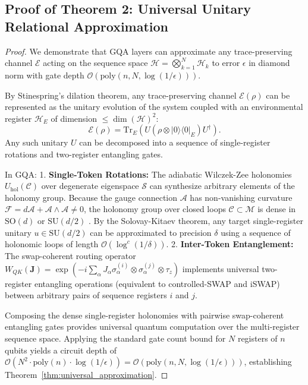 \documentclass{article}
\begin{document}
\subsection{Proof of Theorem 2: Universal Unitary Relational Approximation}
\label{sec:proof_thm2}

\begin{proof}
We demonstrate that GQA layers can approximate any trace-preserving channel $\mathcal{E}$ acting on the sequence space $\mathcal{H} = \bigotimes_{k=1}^N \mathcal{H}_k$ to error $\epsilon$ in diamond norm with gate depth $\mathcal{O}(\mathrm{poly}(n, N, \log(1/\epsilon)))$.

By Stinespring's dilation theorem, any trace-preserving channel $\mathcal{E}(\rho)$ can be represented as the unitary evolution of the system coupled with an environmental register $\mathcal{H}_E$ of dimension $\le \dim(\mathcal{H})^2$:
\begin{equation}
\mathcal{E}(\rho) = \mathrm{Tr}_E\left( U (\rho \otimes |0\rangle\langle 0|_E) U^\dagger \right).
\label{eq:stinespring}
\end{equation}
Any such unitary $U$ can be decomposed into a sequence of single-register rotations and two-register entangling gates. 

In GQA:
1. \textbf{Single-Token Rotations:} The adiabatic Wilczek-Zee holonomies $U_{\mathrm{hol}}(\mathcal{C})$ over degenerate eigenspace $\mathcal{S}$ can synthesize arbitrary elements of the holonomy group. Because the gauge connection $\mathcal{A}$ has non-vanishing curvature $\mathcal{F} = d\mathcal{A} + \mathcal{A} \wedge \mathcal{A} \neq 0$, the holonomy group over closed loops $\mathcal{C} \subset \mathcal{M}$ is dense in $\mathrm{SO}(d)$ or $\mathrm{SU}(d/2)$ \citep{Feng2013ExperimentalRealization}. By the Solovay-Kitaev theorem, any target single-register unitary $u \in \mathrm{SU}(d/2)$ can be approximated to precision $\delta$ using a sequence of holonomic loops of length $\mathcal{O}(\log^c(1/\delta))$.
2. \textbf{Inter-Token Entanglement:} The swap-coherent routing operator $W_{QK}(\boldsymbol{J}) = \exp\left(-i \sum_\alpha J_\alpha \sigma_\alpha^{(i)} \otimes \sigma_\alpha^{(j)} \otimes \tau_z\right)$ implements universal two-register entangling operations (equivalent to controlled-SWAP and iSWAP) between arbitrary pairs of sequence registers $i$ and $j$.

Composing the dense single-register holonomies with pairwise swap-coherent entangling gates provides universal quantum computation over the multi-register sequence space. Applying the standard gate count bound for $N$ registers of $n$ qubits yields a circuit depth of $\mathcal{O}(N^2 \cdot \mathrm{poly}(n) \cdot \log(1/\epsilon)) = \mathcal{O}(\mathrm{poly}(n, N, \log(1/\epsilon)))$, establishing Theorem~\ref{thm:universal_approximation}.
\end{proof}
\end{document}
